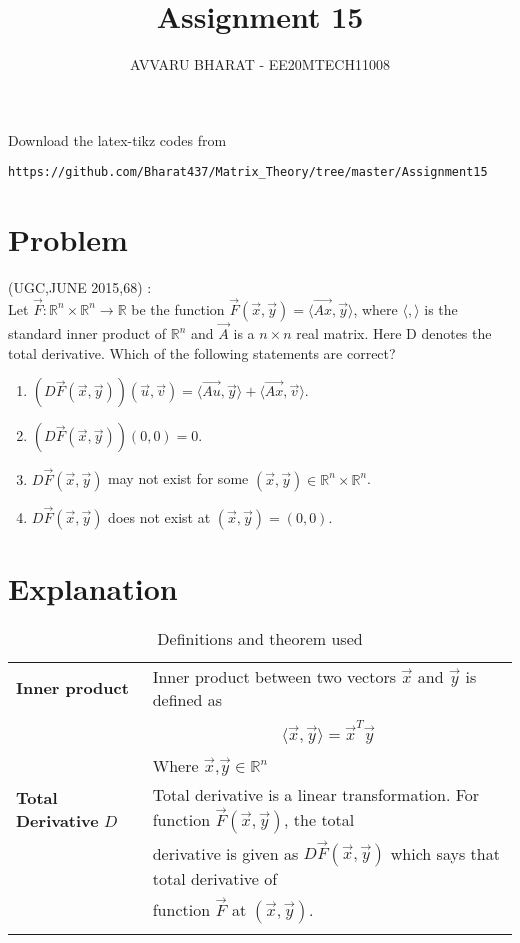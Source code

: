 \documentclass[journal,12pt]{IEEEtran}
\begin{document}
     \def\rightbox#1{\makebox[0in][r]{#1}}
     \def\centbox#1{\makebox[0in]{#1}}
     \def\topbox#1{\raisebox{-\baselineskip}[0in][0in]{#1}}
     \def\midbox#1{\raisebox{-0.5\baselineskip}[0in][0in]{#1}}
\vspace{3cm}
\title{Assignment 15}
\author{AVVARU BHARAT - EE20MTECH11008}
\maketitle
\bigskip
\renewcommand{\thefigure}{\theenumi}
\renewcommand{\thetable}{\theenumi}
%
Download the latex-tikz codes from 
%
\begin{lstlisting}
https://github.com/Bharat437/Matrix_Theory/tree/master/Assignment15
\end{lstlisting}
\section{\textbf{Problem}}
(UGC,JUNE 2015,68) : \\
%
Let $\vec{F}:\mathbb{R}^n\times\mathbb{R}^n\rightarrow\mathbb{R}$ be the function $\vec{F}(\vec{x},\vec{y})=\langle\vec{Ax},\vec{y}\rangle$, where $\langle,\rangle$ is the standard inner product of $\mathbb{R}^n$ and $\vec{A}$ is a $n\times n$ real matrix. Here D denotes the total derivative. Which of the following statements are correct?
\begin{enumerate}
    \item $(D\vec{F}(\vec{x},\vec{y}))(\vec{u},\vec{v})=\langle\vec{Au},\vec{y}\rangle+\langle\vec{Ax},\vec{v}\rangle$.
    \item $(D\vec{F}(\vec{x},\vec{y}))(0,0)=0$.
    \item $D\vec{F}(\vec{x},\vec{y})$ may not exist for some $(\vec{x},\vec{y})\in\mathbb{R}^n\times\mathbb{R}^n$.
    \item $D\vec{F}(\vec{x},\vec{y})$ does not exist at $(\vec{x},\vec{y})=(0,0)$.
\end{enumerate}
\section{\textbf{Explanation}}
\renewcommand{\thetable}{1}
\begin{longtable}{|l|l|}
\hline
\endhead
\textbf{Inner product}&Inner product between two vectors $\vec{x}$ and $\vec{y}$ is defined as\\&\parbox{13cm}{\begin{align}
    \langle\vec{x},\vec{y}\rangle=\vec{x}^T\vec{y}\label{inp}
\end{align}}\\&Where $\vec{x}$,$\vec{y}\in\mathbb{R}^n$\\
\hline
\textbf{Total Derivative} $D$&Total derivative is a linear transformation. For function $\vec{F}(\vec{x},\vec{y})$, the total\\& derivative is given as $D\vec{F}(\vec{x},\vec{y})$ which says that total derivative of\\&function $\vec{F}$ at $(\vec{x},\vec{y})$.\\
\hline
\caption{Definitions and theorem used}
\label{deftab}
\end{longtable}
\end{document}
